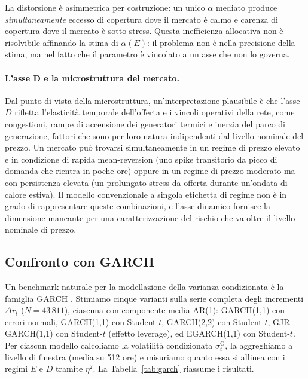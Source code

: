 \documentclass[12pt]{article}
\begin{document}
La distorsione è asimmetrica per costruzione: un unico $\alpha$ mediato produce \emph{simultaneamente} eccesso di copertura dove il mercato è calmo e carenza di copertura dove il mercato è sotto stress.
Questa inefficienza allocativa non è risolvibile affinando la stima di $\alpha(E)$: il problema non è nella precisione della stima, ma nel fatto che il parametro è vincolato a un asse che non lo governa.

\paragraph{L'asse D e la microstruttura del mercato.}
Dal punto di vista della microstruttura, un'interpretazione plausibile è che l'asse $D$ rifletta l'elasticità temporale dell'offerta e i vincoli operativi della rete, come congestioni, rampe di accensione dei generatori termici e inerzia del parco di generazione, fattori che sono per loro natura indipendenti dal livello nominale del prezzo.
Un mercato può trovarsi simultaneamente in un regime di prezzo elevato e in condizione di rapida mean-reversion (uno spike transitorio da picco di domanda che rientra in poche ore) oppure in un regime di prezzo moderato ma con persistenza elevata (un prolungato stress da offerta durante un'ondata di calore estiva).
Il modello convenzionale a singola etichetta di regime non è in grado di rappresentare queste combinazioni, e l'asse dinamico fornisce la dimensione mancante per una caratterizzazione del rischio che va oltre il livello nominale di prezzo.


\subsection{Confronto con GARCH}
\label{sec:garch}

Un benchmark naturale per la modellazione della varianza condizionata è la famiglia GARCH \citep{bollerslev1986}.
Stimiamo cinque varianti sulla serie completa degli incrementi $\Delta r_t$ ($N = 43\,811$), ciascuna con componente media AR(1): GARCH(1,1) con errori normali, GARCH(1,1) con Student-$t$, GARCH(2,2) con Student-$t$, GJR-GARCH(1,1) con Student-$t$ (effetto leverage), ed EGARCH(1,1) con Student-$t$.
Per ciascun modello calcoliamo la volatilità condizionata $\sigma_t^\text{G}$, la aggreghiamo a livello di finestra (media su 512 ore) e misuriamo quanto essa si allinea con i regimi $E$ e $D$ tramite $\eta^2$.
La Tabella~\ref{tab:garch} riassume i risultati.
\end{document}
